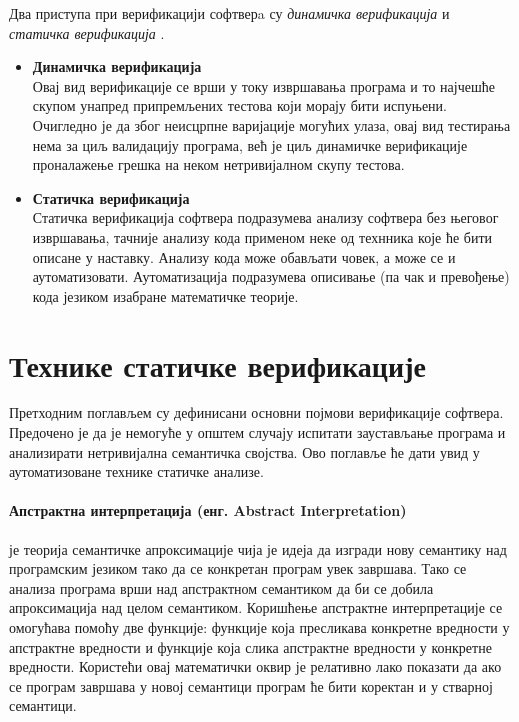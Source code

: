 \documentclass[a4paper]{article}
\begin{document}
{Два приступа при верификацији софтверa су \emph{динамичка верификација} и \emph{статичка верификација} \cite{milena}.
\begin{itemize}
\item \textbf{Динамичка верификација}\\
Овај вид верификације се врши у току извршавања програма и то најчешће скупом 
унапред припремљених тестова који морају бити испуњени. Очигледно је да због неисцрпне варијације могућих улаза, овај вид тестирања нема за циљ валидацију програма, већ је циљ динамичке верификације проналажење грешка на неком нетривијалном скупу тестова.
\item \textbf{Статичка верификација}\\
Статичка верификација софтвера подразумева анализу софтвера без његовог извршавања, тачније анализу кода применом неке од технника које ће бити описане у наставку. Анализу кода може обављати човек, а може се и аутоматизовати. Аутоматизација подразумева описивање (па чак и превођење) кода језиком изабране математичке теорије.
\end{itemize}


\section{Технике статичке верификације}
Претходним поглављем су дефинисани основни појмови верификације софтвера. Предочено је да је немогуће у општем случају испитати заустављање програма и анализирати нетривијална семантичка својства. Ово поглавље ће дати увид у аутоматизоване технике статичке анализе.

\paragraph{Апстрактна интерпретација (енг.  Abstract Interpretation)} је теорија семантичке апроксимације чија је идеја да изгради нову семантику над програмским језиком тако да се конкретан програм увек завршава. Тако се анализа програма врши над апстрактном семантиком да би се добила апроксимација над целом семантиком. Коришћење апстрактне интерпретације се омогућава помоћу две функције: функције која пресликава конкретне вредности у апстрактне вредности и функције која слика апстрактне вредности у конкретне вредности.  Користећи овај математички оквир је релативно лако показати да ако се програм завршава у новој семантици програм ће бити коректан и у стварној семантици.


}
\end{document}

